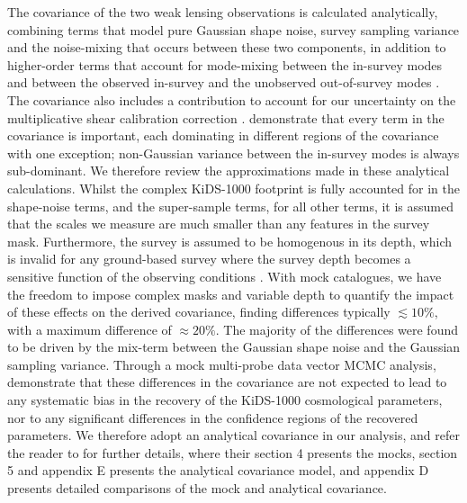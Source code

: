 The covariance of the two weak lensing observations is calculated analytically, combining terms that model pure Gaussian shape noise, survey sampling variance and the noise-mixing that occurs between these two components, in addition to higher-order terms that account for mode-mixing between the in-survey modes and between the observed in-survey and the unobserved out-of-survey modes \citep[known as super-sample covariance,][]{takada/hu:2013}. 
The covariance also includes a contribution to account for our uncertainty on the multiplicative shear calibration correction \citep{kannawadi/etal:2019}. \citet{joachimi/etal:inprep} demonstrate that every term in the covariance is important, each dominating in different regions of the covariance with one exception; non-Gaussian variance between the in-survey modes is always sub-dominant.  We therefore review the approximations made in these analytical calculations.   
Whilst the complex KiDS-1000 footprint is fully accounted for in the shape-noise terms, and the super-sample terms, for all other terms, it is assumed that the scales we measure are much smaller than any features in the survey mask. 
Furthermore, the survey is assumed to be homogenous in its depth, which is invalid for any ground-based survey where the survey depth becomes a sensitive function of the observing conditions \citep{heydenreich/etal:2020}.   With mock catalogues, we have the freedom to impose complex masks and variable depth to quantify the impact of these effects on the derived covariance, finding differences typically $\lesssim 10\%$, with a maximum difference of $\approx\!20 \%$.  The majority of the differences were found to be driven by the mix-term between the Gaussian shape noise and the Gaussian sampling variance.    Through a mock multi-probe data vector MCMC analysis, \citet{joachimi/etal:inprep} demonstrate that these differences in the covariance are not expected to lead to any systematic bias in the recovery of the KiDS-1000 cosmological parameters, nor to any significant differences in the confidence regions of the recovered parameters.   We therefore adopt an analytical covariance in our analysis,  and refer the reader to \citet{joachimi/etal:inprep} for further details, where their section 4 presents the mocks, section 5 and appendix E presents the analytical covariance model, and appendix D presents detailed comparisons of the mock and analytical covariance.

